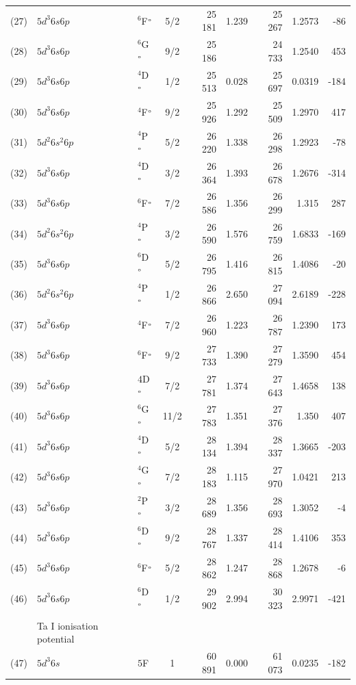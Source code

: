 \documentclass[8pt,a4paper, twoside]{report}
\begin{document}
\begin{table}[p!]
\begin{center}
\begin{tabular}{cl@{\hspace{0.5cm}}l@{\hspace{0.5cm}}c@{\hspace{0.5cm}}r@{\hspace{0.5cm}}r@{\hspace{0.5cm}}r@{\hspace{0.5cm}}r@{\hspace{0.5cm}}r}
(27)  &$5d^3 6s 6p$ & $^6$F$^{\rm_o}$ & 5/2 & 25 181 & 1.239 & 25 267 & 1.2573 & -86 \\
(28)  &$5d^3 6s 6p$ & $^6$G$^{\rm_o}$ & 9/2 & 25 186 &  & 24 733  & 1.2540 & 453 \\
(29)  &$5d^3 6s 6p$ & $^4$D$^{\rm_o}$ & 1/2 & 25 513 & 0.028 & 25 697 & 0.0319  & -184 \\
(30)  &$5d^3 6s 6p$ & $^4$F$^{\rm_o}$  & 9/2 & 25 926 &  1.292 & 25 509 & 1.2970 & 417 \\
(31)  &$5d^2 6s^2 6p$ & $^4$P$^{\rm_o}$ & 5/2 & 26 220 & 1.338 & 26 298 & 1.2923 & -78 \\
(32)  &$5d^3 6s 6p$ & $^4$D$^{\rm_o}$ & 3/2 & 26 364 & 1.393 & 26 678 & 1.2676 & -314 \\
(33)  &$5d^3 6s 6p$ & $^6$F$^{\rm_o}$  & 7/2 & 26 586 & 1.356  & 26 299 & 1.315 & 287 \\
(34)  &$5d^2 6s^2 6p$ & $^4$P$^{\rm_o}$ & 3/2 & 26 590 & 1.576 & 26 759 & 1.6833 & -169\\
(35)  &$5d^3 6s 6p$ & $^6$D$^{\rm_o}$ & 5/2 & 26 795 & 1.416 & 26 815 & 1.4086 & -20 \\
(36)  &$5d^2 6s^2 6p$ & $^4$P$^{\rm_o}$ & 1/2 & 26 866 & 2.650 & 27 094 & 2.6189 & -228\\
(37)  &$5d^3 6s 6p$ &  $^4$F$^{\rm_o}$   & 7/2 & 26 960 & 1.223  & 26 787 & 1.2390 & 173 \\
(38)  &$5d^3 6s 6p$ & $^6$F$^{\rm_o}$  & 9/2 & 27 733 &  1.390 & 27 279 & 1.3590 & 454 \\
(39)  &$5d^3 6s 6p$ & $4$D$^{\rm_o}$   & 7/2 & 27 781 & 1.374  & 27 643 & 1.4658 & 138 \\
(40)  &$5d^3 6s 6p$ & $^6$G$^{\rm_o}$ & 11/2 & 27 783 & 1.351 &  27 376 & 1.350  & 407\\
(41)  &$5d^3 6s 6p$ & $^4$D$^{\rm_o}$ & 5/2 & 28 134 & 1.394 & 28 337 & 1.3665 & -203 \\
(42)  &$5d^3 6s 6p$ & $^4$G$^{\rm_o}$   & 7/2 & 28 183 & 1.115  & 27 970 & 1.0421 & 213 \\
(43) &$5d^3 6s 6p$ & $^2$P$^{\rm_o}$   & 3/2 & 28 689 & 1.356  & 28 693 & 1.3052  & -4 \\
(44)  &$5d^3 6s 6p$ & $^6$D$^{\rm_o}$  & 9/2 & 28 767 &  1.337 & 28 414 & 1.4106 & 353 \\
(45)  &$5d^3 6s 6p$ & $^6$F$^{\rm_o}$ & 5/2 & 28 862 & 1.247 & 28 868 & 1.2678 & -6 \\
(46)  &$5d^3 6s 6p$ & $^6$D$^{\rm_o}$ & 1/2 & 29 902 & 2.994 & 30 323 & 2.9971 & -421 \\
\\
& Ta I ionisation potential \\
(47)  &$5d^3 6s$& $5$F & 1 & 60 891 & 0.000 & 61 073 &    0.0235 &  -182\\
\bottomrule
\bottomrule
\end{tabular}
\end{center}
\end{table}
\end{document}
